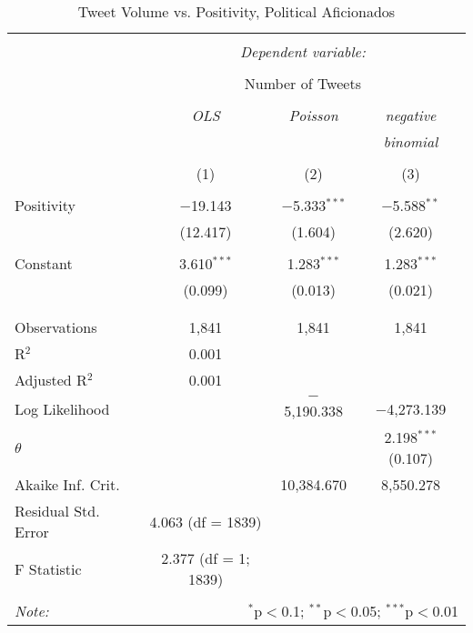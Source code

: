 \begin{table}[!htbp] \centering 
  \caption{Tweet Volume vs. Positivity, Political Aficionados} 
  \label{} 
    \begin{tabular}{@{\extracolsep{5pt}}lccc} 
    \\[-1.8ex]\hline 
    \hline \\[-1.8ex] 
     & \multicolumn{3}{c}{\textit{Dependent variable:}} \\ 
    \cline{2-4} 
    \\[-1.8ex] & \multicolumn{3}{c}{Number of Tweets} \\ 
    \\[-1.8ex] & \textit{OLS} & \textit{Poisson} & \textit{negative} \\ 
     & \textit{} & \textit{} & \textit{binomial} \\ 
    \\[-1.8ex] & (1) & (2) & (3)\\ 
    \hline \\[-1.8ex] 
     Positivity & $-$19.143 & $-$5.333$^{***}$ & $-$5.588$^{**}$ \\ 
      & (12.417) & (1.604) & (2.620) \\ 
      & & & \\ 
     Constant & 3.610$^{***}$ & 1.283$^{***}$ & 1.283$^{***}$ \\ 
      & (0.099) & (0.013) & (0.021) \\ 
      & & & \\ 
    \hline \\[-1.8ex] 
    Observations & 1,841 & 1,841 & 1,841 \\ 
    R$^{2}$ & 0.001 &  &  \\ 
    Adjusted R$^{2}$ & 0.001 &  &  \\ 
    Log Likelihood &  & $-$5,190.338 & $-$4,273.139 \\ 
    $\theta$ &  &  & 2.198$^{***}$  (0.107) \\ 
    Akaike Inf. Crit. &  & 10,384.670 & 8,550.278 \\ 
    Residual Std. Error & 4.063 (df = 1839) &  &  \\ 
    F Statistic & 2.377 (df = 1; 1839) &  &  \\ 
    \hline 
    \hline \\[-1.8ex] 
    \textit{Note:}  & \multicolumn{3}{r}{$^{*}$p$<$0.1; $^{**}$p$<$0.05; $^{***}$p$<$0.01} \\ 
    \end{tabular} 
\end{table} 

\clearpage
\newpage 